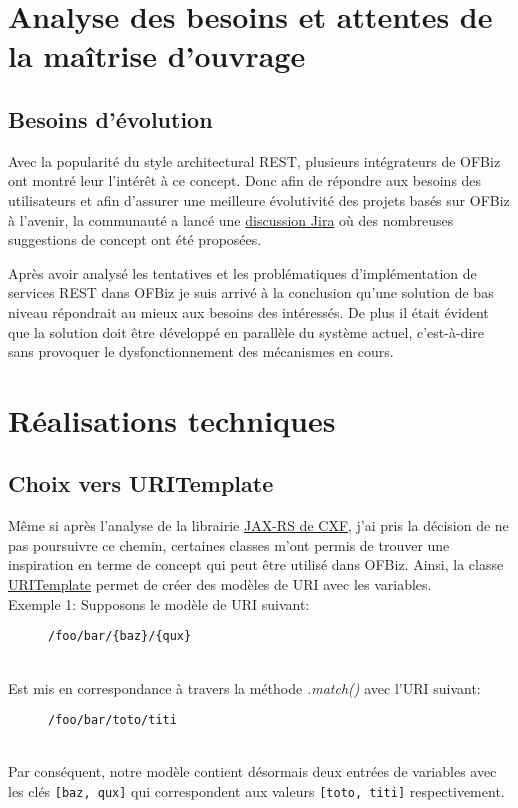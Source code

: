 \section{Analyse des besoins et attentes de la maîtrise d'ouvrage}
\subsection{Besoins d'évolution}
Avec la popularité du style architectural REST, plusieurs intégrateurs de OFBiz ont montré leur l'intérêt à ce concept. 
Donc afin de répondre aux besoins des utilisateurs et afin d'assurer une meilleure évolutivité des projets basés sur OFBiz à l'avenir, la communauté a lancé une  \href{https://issues.apache.org/jira/browse/OFBIZ-4274}{discussion Jira} où des nombreuses suggestions de concept ont été proposées. 

Après avoir analysé les tentatives et les problématiques d'implémentation de services REST dans OFBiz je suis arrivé à la conclusion qu'une solution de bas niveau répondrait au mieux aux besoins des intéressés. De plus il était évident que la solution doit être développé en parallèle du système actuel, c'est-à-dire sans provoquer le dysfonctionnement des mécanismes en cours. 




\section{Réalisations techniques}
\subsection{Choix vers URITemplate}
Même si après l'analyse de la librairie \href{http://cxf.apache.org/docs/jax-rs.html}{JAX-RS de CXF}, j'ai pris la décision de ne pas poursuivre ce chemin, certaines classes m'ont permis de trouver une inspiration en terme de concept qui peut être utilisé dans OFBiz. Ainsi, la classe \href{https://cxf.apache.org/javadoc/latest/org/apache/cxf/jaxrs/model/URITemplate.html}{URITemplate}  permet de créer des modèles de URI avec les variables. \\
Exemple 1: 
Supposons le modèle de URI suivant:
\begin{figure}[h!]
	\begin{lstlisting}[frame=leftline]
/foo/bar/{baz}/{qux}
	\end{lstlisting}
\end{figure}
\\Est mis en correspondance à travers la méthode \emph{.match()} avec l'URI suivant:
\begin{figure}[h!]
	\begin{lstlisting}[frame=leftline]
/foo/bar/toto/titi
	\end{lstlisting}
\end{figure}\\
Par conséquent, notre modèle contient désormais deux entrées de variables avec les clés \verb|[baz, qux]| qui correspondent aux valeurs \verb|[toto, titi]| respectivement. 

